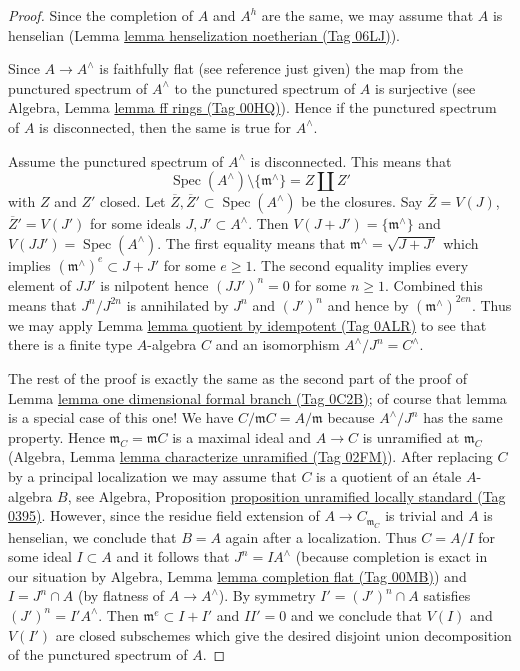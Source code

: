 \documentclass{amsart}
\theoremstyle{plain}
\theoremstyle{definition}
\theoremstyle{remark}
\numberwithin{equation}{subsection}
\def\Spec{\mathop{\mathrm{Spec}}}
\begin{document}
\begin{proof}
Since the completion of $A$ and $A^h$ are the same, we may assume
that $A$ is henselian (Lemma \href{https://stacks.math.columbia.edu/tag/06LJ}{lemma henselization noetherian (Tag 06LJ)}).

\medskip\noindent
Since $A \to A^\wedge$ is faithfully flat (see reference just given)
the map from the punctured spectrum of $A^\wedge$ to the punctured
spectrum of $A$ is surjective
(see Algebra, Lemma \href{https://stacks.math.columbia.edu/tag/00HQ}{lemma ff rings (Tag 00HQ)}).
Hence if the punctured spectrum of $A$ is disconnected, then
the same is true for $A^\wedge$.

\medskip\noindent
Assume the punctured spectrum of $A^\wedge$ is disconnected.
This means that
$$
\Spec(A^\wedge) \setminus \{\mathfrak m^\wedge\} = Z \amalg Z'
$$
with $Z$ and $Z'$ closed. Let
$\overline{Z}, \overline{Z}' \subset \Spec(A^\wedge)$ be the closures.
Say $\overline{Z} = V(J)$, $\overline{Z}' = V(J')$ for some ideals
$J, J' \subset A^\wedge$. Then $V(J + J') = \{\mathfrak m^\wedge\}$
and $V(JJ') = \Spec(A^\wedge)$. The first equality means that
$\mathfrak m^\wedge = \sqrt{J + J'}$ which implies
$(\mathfrak m^\wedge)^e \subset J + J'$ for some $e \geq 1$.
The second equality implies every element
of $JJ'$ is nilpotent hence $(JJ')^n = 0$ for some $n \geq 1$.
Combined this means that $J^n/J^{2n}$ is annihilated by
$J^n$ and $(J')^n$ and hence by $(\mathfrak m^\wedge)^{2en}$.
Thus we may apply Lemma \href{https://stacks.math.columbia.edu/tag/0ALR}{lemma quotient by idempotent (Tag 0ALR)}
to see that there is a finite type $A$-algebra $C$ and an
isomorphism $A^\wedge/J^n = C^\wedge$.

\medskip\noindent
The rest of the proof is exactly the same as the second part
of the proof of Lemma \href{https://stacks.math.columbia.edu/tag/0C2B}{lemma one dimensional formal branch (Tag 0C2B)};
of course that lemma is a special case of this one!
We have $C/\mathfrak m C = A/\mathfrak m$ because $A^\wedge/J^n$ has the same
property. Hence $\mathfrak m_C = \mathfrak m C$ is a maximal ideal
and $A \to C$ is unramified at $\mathfrak m_C$
(Algebra, Lemma \href{https://stacks.math.columbia.edu/tag/02FM}{lemma characterize unramified (Tag 02FM)}).
After replacing $C$ by a principal localization we may
assume that $C$ is a quotient of an \'etale $A$-algebra $B$, see
Algebra, Proposition \href{https://stacks.math.columbia.edu/tag/0395}{proposition unramified locally standard (Tag 0395)}.
However, since the residue field extension of $A \to C_{\mathfrak m_C}$
is trivial and $A$ is henselian, we conclude that $B = A$
again after a localization.
Thus $C = A/I$ for some ideal $I \subset A$ and it follows that
$J^n = IA^\wedge$ (because completion is exact in our situation by
Algebra, Lemma \href{https://stacks.math.columbia.edu/tag/00MB}{lemma completion flat (Tag 00MB)}) and $I = J^n \cap A$
(by flatness of $A \to A^\wedge$).
By symmetry $I' = (J')^n \cap A$ satisfies $(J')^n = I'A^\wedge$.
Then $\mathfrak m^e \subset I + I'$ and $II' = 0$
and we conclude that $V(I)$ and $V(I')$ are closed subschemes
which give the desired disjoint union decomposition of the
punctured spectrum of $A$.
\end{proof}
\end{document}
